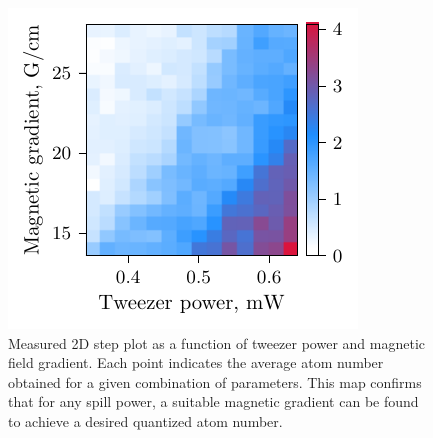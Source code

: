 
\begin{figure}[h]
    \centering
    \includegraphics{fig-py/step-plot-2d.pdf}
    \caption{
        Measured 2D step plot as a function of tweezer power and magnetic field gradient. Each point indicates the average atom number obtained for a given combination of parameters. This map confirms that for any spill power, a suitable magnetic gradient can be found to achieve a desired quantized atom number.
    }
    \label{fig:spillingadd-2d}
\end{figure}




